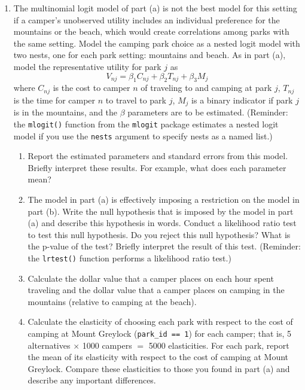 \documentclass[11pt,letterpaper]{article}
\begin{document}
\begin{enumerate}[label=\alph*., leftmargin=*]
	\item The multinomial logit model of part (a) is not the best model for this setting if a camper's unobserved utility includes an individual preference for the mountains or the beach, which would create correlations among parks with the same setting. Model the camping park choice as a nested logit model with two nests, one for each park setting: mountains and beach. As in part (a), model the representative utility for park $j$ as
	$$V_{nj} = \beta_1 C_{nj} + \beta_2 T_{nj} + \beta_3 M_j$$
	where $C_{nj}$ is the cost to camper $n$ of traveling to and camping at park $j$, $T_{nj}$ is the time for camper $n$ to travel to park $j$, $M_j$ is a binary indicator if park $j$ is in the mountains, and the $\beta$ parameters are to be estimated. (Reminder: the \texttt{mlogit()} function from the \texttt{mlogit} package estimates a nested logit model if you use the \texttt{nests} argument to specify nests as a named list.)

	\begin{enumerate}[label=\roman*.]
		\item Report the estimated parameters and standard errors from this model. Briefly interpret these results. For example, what does each parameter mean?

		\item The model in part (a) is effectively imposing a restriction on the model in part (b). Write the null hypothesis that is imposed by the model in part (a) and describe this hypothesis in words. Conduct a likelihood ratio test to test this null hypothesis. Do you reject this null hypothesis? What is the p-value of the test? Briefly interpret the result of this test. (Reminder: the \texttt{lrtest()} function performs a likelihood ratio test.)

		\item Calculate the dollar value that a camper places on each hour spent traveling and the dollar value that a camper places on camping in the mountains (relative to camping at the beach).

		\item Calculate the elasticity of choosing each park with respect to the cost of camping at Mount Greylock (\texttt{park\_id == 1}) for each camper; that is, 5 alternatives $\times$ 1000 campers $=$ 5000 elasticities. For each park, report the mean of its elasticity with respect to the cost of camping at Mount Greylock. Compare these elasticities to those you found in part (a) and describe any important differences.
	\end{enumerate}
\end{enumerate}
\end{document}
